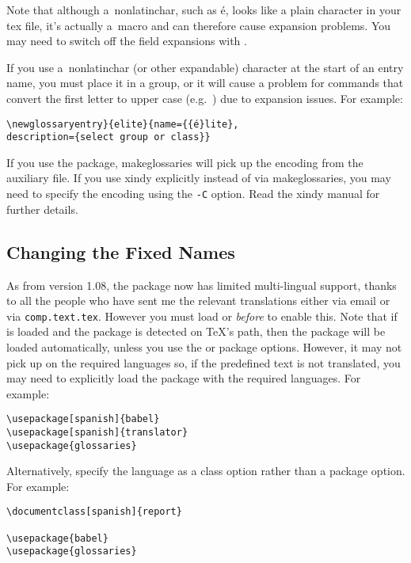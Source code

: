 \documentclass[report,inlinetitle]{nlctdoc}
\begin{document}
\begin{important}
Note that although a~\gls{nonlatinchar}, such as \'e, looks like a plain
character in your tex file, it's actually a~macro and can therefore
cause expansion problems. You may need to switch off the field
expansions with .

If you use a~\gls{nonlatinchar} (or other expandable) character at the start of
an entry name, you must place it in a group, or it will cause
a problem for commands that convert the first letter to upper case
(e.g.\ ) due to expansion issues. For example:
\begin{alltt}
\verb|\newglossaryentry}{elite}{name={{|\'e\verb|}lite},|
description=\verb|{select group or class}}|
\end{alltt}
\end{important}

If you use the  package, \gls{makeglossaries}
will pick up the encoding from the auxiliary file. If you use
\gls{xindy} explicitly instead of via \gls*{makeglossaries},
you may need to specify the encoding using the \texttt{-C} 
option. Read the \gls*{xindy} manual for further details.

\subsection{Changing the Fixed Names}
\label{sec:fixednames}

As from version 1.08, the  package now has
limited multi-lingual support, thanks to all the people who have sent
me the relevant translations either via email or via 
\texttt{comp.text.tex}.
However you must load  or  \emph{before} 
 to enable this. Note that if  is loaded 
and the  package is detected on \TeX's path, then the
 package will be loaded automatically, unless you
use the  or 
package options.  However,
it may not pick up on the required languages so, if the predefined
text is not translated, you may need to explicitly load the
 package with the required languages. For example:
\begin{verbatim}
\usepackage[spanish]{babel}
\usepackage[spanish]{translator}
\usepackage{glossaries}
\end{verbatim}
Alternatively, specify the language as a class option rather
than a package option. For example:
\begin{verbatim}
\documentclass[spanish]{report}

\usepackage{babel}
\usepackage{glossaries}
\end{verbatim}
\end{document}
